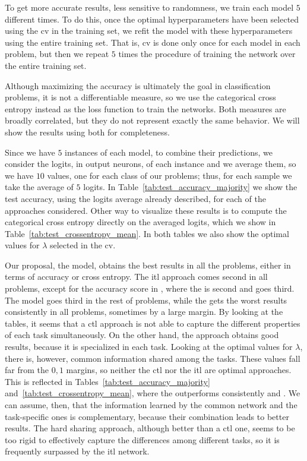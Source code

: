 To get more accurate results, less sensitive to randomness, we train each model $5$ different times. To do this, once the optimal hyperparameters have been selected using the \acrshort{cv} in the training set, we refit the model with these hyperparameters using the entire training set. That is, \acrshort{cv} is done only once for each model in each problem, but then we repeat $5$ times the procedure of training the network over the entire training set.

Although maximizing the accuracy is ultimately the goal in classification problems, it is not a differentiable measure, so we use the categorical cross entropy instead as the loss function to train the networks. Both measures are broadly correlated, but they do not represent exactly the same behavior. We will show the results using both for completeness.

Since we have $5$ instances of each model, to combine their predictions, we consider the logits, in output neurons, of each instance and we average them, so we have $10$ values, one for each class of our problems; thus, for each sample we take the average of $5$ logits.
In Table~\ref{tab:test_accuracy_majority} we show the test accuracy, using the logits average already described, for each of the approaches considered.
%
Other way to visualize these results is to compute the categorical cross entropy directly on the averaged logits, which we show in Table~\ref{tab:test_crossentropy_mean}.
%
In both tables we also show the optimal values for $\lambda$ selected in the \acrshort{cv}.

Our proposal, the  model, obtains the best results in all the problems, either in terms of accuracy or cross entropy.
The \acrshort{itl} approach comes second in all problems, except for the accuracy score in , where the  is second and  goes third.
The  model goes third in the rest of problems, while the  gets the worst results consistently in all problems, sometimes by a large margin.
%
By looking at the tables, it seems that a \acrshort{ctl} approach is not able to capture the different properties of each task simultaneously. On the other hand, the  approach obtains good results, because it is specialized in each task.
Looking at the optimal values for $\lambda$, there is, however, common information shared among the tasks. These values fall far from the $0, 1$ margins, so neither the \acrshort{ctl} nor the \acrshort{itl} are optimal approaches. This is reflected in Tables~\ref{tab:test_accuracy_majority} and~\ref{tab:test_crossentropy_mean}, where the  outperforms consistently  and . We can assume, then, that the information learned by the common network and the task-specific ones is complementary, because their combination leads to better results.
%
The hard sharing approach, although better than a \acrshort{ctl} one, seems to be too rigid to effectively capture the differences among different tasks, so it is frequently surpassed by the \acrshort{itl} network.




